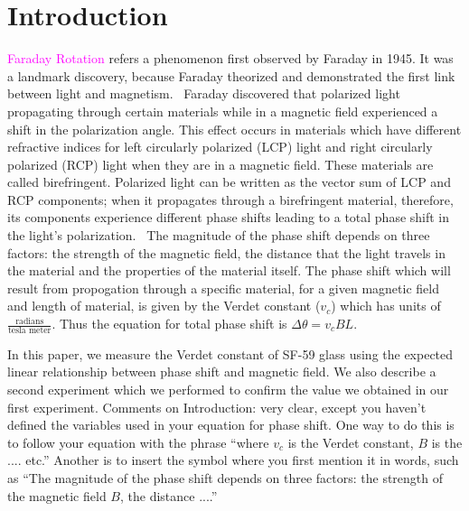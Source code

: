 \documentclass[prb,preprint]{revtex4-1}
\begin{document}
\maketitle %


\section{Introduction} %

\textcolor{magenta}{Faraday Rotation} refers a phenomenon first observed by Faraday in 1945. It was a landmark discovery, because Faraday theorized and demonstrated the first link between light and magnetism.~\cite{teachspin} Faraday discovered that polarized light propagating through certain materials while in a magnetic field experienced a shift in the polarization angle. This effect occurs in materials which have different refractive indices for left circularly polarized (LCP) light and right circularly polarized (RCP) light when they are in a magnetic field. These materials are called birefringent. Polarized light can be written as the vector sum of LCP and RCP components; when it propagates through a birefringent material, therefore, its components experience different phase shifts leading to a total phase shift in the light's polarization.~\cite{melissanos} The magnitude of the phase shift depends on three factors: the strength of the magnetic field, the distance that the light travels in the material and the properties of the material itself. The phase shift which will result from propogation through a specific material, for a given magnetic field and length of material, is given by the Verdet constant ($v_c$) which has units of $\frac{\text{radians}}{\text{tesla\ meter}}$. Thus the equation for total phase shift is $\Delta \theta = v_c B L$.



In this paper, we measure the Verdet constant of SF-59 glass using the expected linear relationship between phase shift and magnetic field. We also describe a second experiment which we performed to confirm the value we obtained in our first experiment.
{\color{blue}Comments on Introduction: very clear, except you haven't defined the variables used in your equation for phase shift. One way to do this is to follow your equation with the phrase ``where $v_c$ is the Verdet constant, $B$ is the .... etc.''  Another is to insert the symbol where you first mention it in words, such as ``The magnitude of the phase shift depends on three factors: the strength of the magnetic field $B$, the distance ....''}
\end{document}
